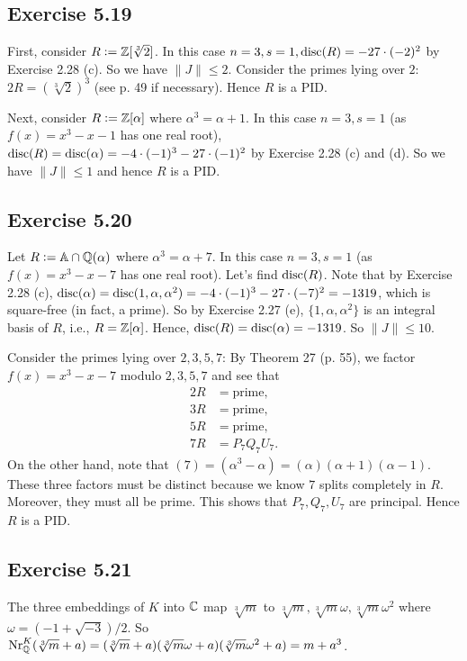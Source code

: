 \documentclass[../Marcus.tex]{subfiles}
\begin{document}
\subsection*{Exercise 5.19}

First, consider $R:=\mathbb{Z}[\sqrt[3]{2}]$. In this case $n=3,s=1,\operatorname{disc}(R) = -27\cdot(-2)^2$ by Exercise 2.28 (c). So we have $\|J\| \leq 2$. Consider the primes lying over $2$: $2R=(\sqrt[3]{2})^3$ (see p. 49 if necessary). Hence $R$ is a PID.

Next, consider $R:=\mathbb{Z}[\alpha]$ where $\alpha^3=\alpha+1$. In this case $n=3,s=1$ (as $f(x)=x^3-x-1$ has one real root), $\operatorname{disc}(R) = \operatorname{disc}(\alpha) = -4\cdot(-1)^3-27\cdot(-1)^2$ by Exercise 2.28 (c) and (d). So we have $\|J\| \leq 1$ and hence $R$ is a PID.

\subsection*{Exercise 5.20}

Let $R:=\mathbb{A}\cap\mathbb{Q}(\alpha)$ where $\alpha^3=\alpha+7$. In this case $n=3,s=1$ (as $f(x)=x^3-x-7$ has one real root). Let's find $\operatorname{disc}(R)$. Note that by Exercise 2.28 (c), $\operatorname{disc}(\alpha) = \operatorname{disc}(1,\alpha,\alpha^2) = -4\cdot(-1)^3-27\cdot(-7)^2 = -1319$, which is square-free (in fact, a prime). So by Exercise 2.27 (e), $\{1,\alpha,\alpha^2\}$ is an integral basis of $R$, i.e., $R=\mathbb{Z}[\alpha]$. Hence, $\operatorname{disc}(R) = \operatorname{disc}(\alpha) = -1319$. So $\|J\| \leq 10$.

Consider the primes lying over $2,3,5,7$: By Theorem 27 (p. 55), we factor $f(x)=x^3-x-7$ modulo $2,3,5,7$ and see that
\begin{align*}
2R &= \text{prime},    \\
3R &= \text{prime},    \\
5R &= \text{prime},   \\
7R &= P_7Q_7U_7.
\end{align*}
On the other hand, note that $(7) = (\alpha^3-\alpha) = (\alpha)(\alpha+1)(\alpha-1)$. These three factors must be distinct because we know $7$ splits completely in $R$. Moreover, they must all be prime. This shows that $P_7,Q_7,U_7$ are principal. Hence $R$ is a PID.

\subsection*{Exercise 5.21}

The three embeddings of $K$ into $\mathbb{C}$ map $\sqrt[3]{m}$ to $\sqrt[3]{m},\sqrt[3]{m}\omega,\sqrt[3]{m}\omega^2$ where $\omega=(-1+\sqrt{-3})/2$. So $\operatorname{Nr}^K_{\mathbb{Q}}(\sqrt[3]{m} + a) = (\sqrt[3]{m}+a)(\sqrt[3]{m}\omega+a)(\sqrt[3]{m}\omega^2+a) = m+a^3$.
\end{document}
